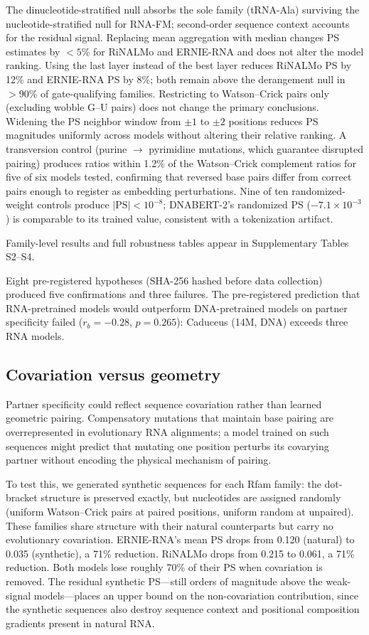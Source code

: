 \documentclass[11pt]{article}
\begin{document}
The dinucleotide-stratified null absorbs the sole family (tRNA-Ala)
surviving the nucleotide-stratified null for RNA-FM; second-order sequence
context accounts for the residual signal. Replacing
mean aggregation with median changes PS estimates by $< 5$\% for RiNALMo
and ERNIE-RNA and does not alter the model ranking. Using the last layer
instead of the best layer reduces RiNALMo PS by 12\% and ERNIE-RNA PS by
8\%; both remain above the derangement null in $> 90$\% of gate-qualifying
families. Restricting to Watson--Crick pairs only (excluding wobble G--U
pairs) does not change the primary conclusions. Widening the PS neighbor
window from $\pm 1$ to $\pm 2$ positions reduces PS magnitudes uniformly
across models without altering their relative ranking.
A transversion control (purine $\to$ pyrimidine mutations, which
guarantee disrupted pairing) produces ratios within 1.2\% of the
Watson--Crick complement ratios for five of six models tested,
confirming that reversed base pairs differ from correct pairs enough
to register as embedding perturbations. Nine of ten
randomized-weight controls produce $|\text{PS}| < 10^{-8}$; DNABERT-2's
randomized PS ($-7.1 \times 10^{-3}$) is comparable to its trained value,
consistent with a tokenization artifact.

Family-level results and full robustness tables appear in Supplementary
Tables S2--S4.


Eight pre-registered hypotheses (SHA-256 hashed before data collection)
produced five confirmations and three failures.
The pre-registered prediction that RNA-pretrained models would
outperform DNA-pretrained models on partner specificity failed
($r_b = -0.28$, $p = 0.265$): Caduceus (14M, DNA) exceeds three RNA
models.


\subsection{Covariation versus geometry}
\label{sec:covariation-results}

Partner specificity could reflect sequence covariation rather than
learned geometric pairing. Compensatory mutations that maintain base
pairing are overrepresented in evolutionary RNA alignments; a model
trained on such sequences might predict that mutating one position
perturbs its covarying partner without encoding the physical mechanism
of pairing.

To test this, we generated synthetic sequences for each Rfam family:
the dot-bracket structure is preserved exactly, but nucleotides are
assigned randomly (uniform Watson--Crick pairs at paired positions,
uniform random at unpaired). These families share structure with their
natural counterparts but carry no evolutionary covariation.
ERNIE-RNA's mean PS drops from 0.120 (natural) to 0.035 (synthetic),
a 71\% reduction. RiNALMo drops from 0.215 to 0.061, a 71\%
reduction. Both models lose roughly 70\% of their PS when covariation
is removed. The residual synthetic PS---still orders of magnitude
above the weak-signal models---places an upper bound on the
non-covariation contribution, since the synthetic sequences also
destroy sequence context and positional composition gradients present
in natural RNA.
\end{document}
